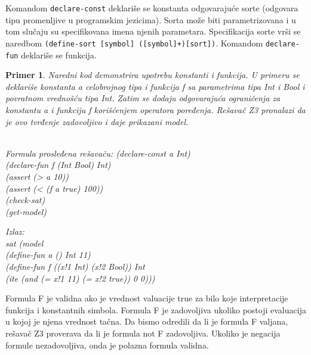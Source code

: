\documentclass[12pt,oneside]{memoir}
\newtheorem{primer}{Primer}
\begin{document}

Komandom \texttt{declare-const} deklariše se konstanta odgovarajuće sorte (odgovara tipu promenljive u programskim jezicima). Sorta može biti parametrizovana i u tom slučaju su specifikovana imena njenih parametara. Specifikacija sorte vrši se naredbom \texttt{(define-sort [symbol] ([symbol]+)[sort])}.
Komandom \texttt{declare-fun} deklariše se funkcija. 


\begin{primer} Naredni kod demonstrira upotrebu konstanti i funkcija. U primeru se deklariše konstanta a celobrojnog tipa i funkcija f sa parametrima tipa Int i Bool i povratnom vrednošću tipa Int. Zatim se dodaju odgovarajuća ograničenja za konstantu a i funkciju f korišćenjem operatora poređenja. Rešavač Z3 pronalazi da je ovo tvrđenje zadovoljivo i daje prikazani model. 
\\ \\

\hspace{-0.7cm}
\begin{minipage}[b]{0.4\textwidth}
Formula prosleđena rešavaču:
(declare-const a Int)\\
(declare-fun f (Int Bool) Int)\\
(assert (> a 10))\\
(assert (< (f a true) 100))\\
(check-sat)\\
(get-model) \\
\end{minipage}
\hspace{2.4cm}
\begin{minipage}[t]{0.4\textwidth}
\vspace{-4.75cm}
Izlaz:
\\sat (model 
\\(define-fun a () Int 11) 
\\(define-fun f ((x!1 Int) (x!2 Bool)) Int 
\\(ite (and (= x!1 11) (= x!2 true)) 0 0)))
\end{minipage}
\end{primer}


Formula F je validna ako je vrednost valuacije true za bilo koje interpretacije funkcija i konstantnih simbola. Formula F je zadovoljiva ukoliko postoji evaluacija u kojoj je njena vrednost tačna. Da bismo odredili da li je formula F valjana, rešavač Z3 proverava da li je formula not F zadovoljiva. Ukoliko je negacija formule nezadovoljiva, onda je polazna formula validna. 
\end{document}
